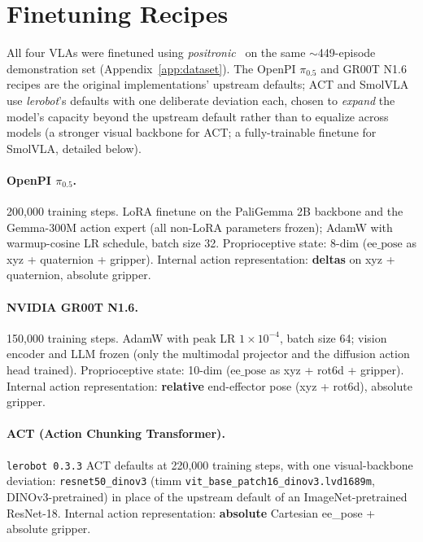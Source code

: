 \documentclass{article}
\begin{document}
\section{Finetuning Recipes}\label{app:finetune}

All four VLAs were finetuned using \emph{positronic}~\cite{positronic} on the same $\sim$449-episode demonstration set (Appendix~\ref{app:dataset}). The OpenPI $\pi_{0.5}$ and GR00T N1.6 recipes are the original implementations' upstream defaults; ACT and SmolVLA use \emph{lerobot}'s defaults with one deliberate deviation each, chosen to \emph{expand} the model's capacity beyond the upstream default rather than to equalize across models (a stronger visual backbone for ACT; a fully-trainable finetune for SmolVLA, detailed below).

\paragraph{OpenPI $\pi_{0.5}$.} 200{,}000 training steps. LoRA finetune on the PaliGemma 2B backbone and the Gemma-300M action expert (all non-LoRA parameters frozen); AdamW with warmup-cosine LR schedule, batch size 32. Proprioceptive state: 8-dim ($\text{ee\_pose}$ as xyz + quaternion + gripper). Internal action representation: \textbf{deltas} on xyz + quaternion, absolute gripper.

\paragraph{NVIDIA GR00T N1.6.} 150{,}000 training steps. AdamW with peak LR $1{\times}10^{-4}$, batch size 64; vision encoder and LLM frozen (only the multimodal projector and the diffusion action head trained). Proprioceptive state: 10-dim ($\text{ee\_pose}$ as xyz + rot6d + gripper). Internal action representation: \textbf{relative} end-effector pose (xyz + rot6d), absolute gripper.

\paragraph{ACT (Action Chunking Transformer).} \texttt{lerobot 0.3.3} ACT defaults at 220{,}000 training steps, with one visual-backbone deviation: \texttt{resnet50\_dinov3} (timm \texttt{vit\_base\_patch16\_dinov3.lvd1689m}, DINOv3-pretrained) in place of the upstream default of an ImageNet-pretrained ResNet-18. Internal action representation: \textbf{absolute} Cartesian ee\_pose + absolute gripper.
\end{document}
